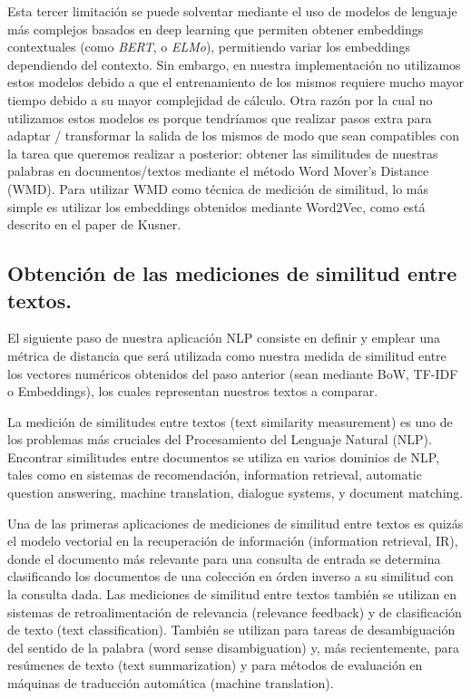 \documentclass[12pt,a4paper]{article}
\begin{document}
\begin{sloppypar}
Esta tercer limitación se puede solventar mediante el uso de modelos de lenguaje más complejos basados en deep learning que permiten obtener embeddings contextuales (como \textit{BERT}, o \textit{ELMo}), permitiendo variar los embeddings dependiendo del contexto. Sin embargo, en nuestra implementación no utilizamos estos modelos debido a que el entrenamiento de los mismos requiere mucho mayor tiempo debido a su mayor complejidad de cálculo\cite{NLP_2}. Otra razón por la cual no utilizamos estos modelos es porque tendríamos que realizar pasos extra para adaptar / transformar la salida de los mismos de modo que sean compatibles con la tarea que queremos realizar a posterior: obtener las similitudes de nuestras palabras en documentos/textos mediante el método Word Mover’s Distance (WMD). Para utilizar WMD como técnica de medición de similitud, lo más simple es utilizar los embeddings obtenidos mediante Word2Vec, como está descrito en el paper de Kusner\cite{NLP_15}.
\\

\subsection{Obtención de las mediciones de similitud entre textos.}\label{med_sim_textos}

El siguiente paso de nuestra aplicación NLP consiste en definir y emplear una métrica de distancia que será utilizada como nuestra medida de similitud entre los vectores numéricos obtenidos del paso anterior (sean mediante BoW, TF-IDF o Embeddings), los cuales representan nuestros textos a comparar.

La medición de similitudes entre textos (text similarity measurement) es uno de los problemas más cruciales del Procesamiento del Lenguaje Natural (NLP). Encontrar similitudes entre documentos se utiliza en varios dominios de NLP, tales como en sistemas de recomendación, information retrieval, automatic question answering, machine translation, dialogue systems, y document matching\cite{similarity_survey}.

Una de las primeras aplicaciones de mediciones de similitud entre textos es quizás el modelo vectorial en la recuperación de información (information retrieval, IR), donde el documento más relevante para una consulta de entrada se determina clasificando los documentos de una colección en órden inverso a su similitud con la consulta dada. Las mediciones de similitud entre textos también se utilizan en sistemas de retroalimentación de relevancia (relevance feedback) y de clasificación de texto (text classification). También se utilizan para tareas de desambiguación del sentido de la palabra (word sense disambiguation) y, más recientemente, para resúmenes de texto (text summarization) y para métodos de evaluación en máquinas de traducción automática (machine translation)\cite{NLP_17_18}.


\end{sloppypar}
\end{document}
